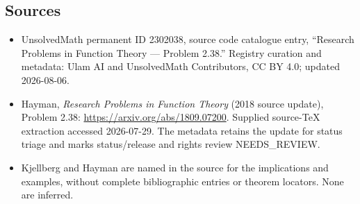 \documentclass[11pt]{article}
\begin{document}
\subsection{Sources}
\begin{itemize}
\item UnsolvedMath permanent ID 2302038, source code catalogue entry, ``Research Problems in Function Theory --- Problem 2.38.'' Registry curation and metadata: Ulam AI and UnsolvedMath Contributors, CC BY 4.0; updated 2026-08-06.
\item Hayman, \emph{Research Problems in Function Theory} (2018 source update), Problem 2.38: \url{https://arxiv.org/abs/1809.07200}. Supplied source-TeX extraction accessed 2026-07-29. The metadata retains the update for status triage and marks status/release and rights review NEEDS\_REVIEW.
\item Kjellberg and Hayman are named in the source for the implications and examples, without complete bibliographic entries or theorem locators. None are inferred.
\end{itemize}
\end{document}
